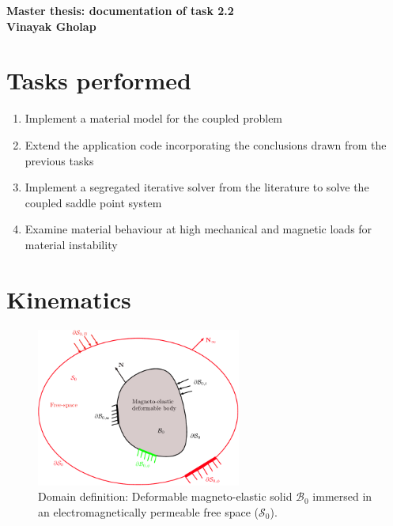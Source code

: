 \documentclass[11pt,a4paper,final]{article}
\begin{document}
\begin{center}
\textbf{\Large Master thesis: documentation of task 2.2}\\ \vspace{0.25cm}
\textbf{\large Vinayak Gholap}
\end{center}

\section{Tasks performed}
\begin{enumerate}
\item Implement a material model for the coupled problem
\item Extend the application code incorporating the conclusions drawn from the previous tasks
\item Implement a segregated iterative solver from the literature \cite{Benzi2005} to solve the coupled saddle point system
\item Examine material behaviour at high mechanical and magnetic loads for material instability
\end{enumerate}

\section{Kinematics}

\begin{figure}[h]
\centering
\includegraphics[width=0.6\textwidth]{kinematics_potato_coupled.pdf}
\caption{Domain definition: Deformable magneto-elastic solid $\mathcal{B}_0$ immersed in an electromagnetically permeable free space ($\mathcal{S}_0$).}
\label{fig:3.2}
\end{figure}
\end{document}
